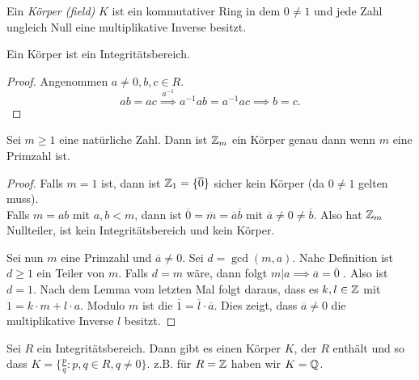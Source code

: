 \begin{definition}
	Ein \emph{Körper (field)} $K$ ist ein kommutativer Ring in dem $0 \neq 1$ und jede Zahl ungleich Null eine multiplikative Inverse besitzt.
\end{definition}

\begin{lemma}
	Ein Körper ist ein Integritätsbereich.
\end{lemma}

\begin{proof}
	Angenommen $a \neq  0, b,c \in R$.
	\[
	ab = ac \stackrel{a^{-1}}{\implies} a^{-1} a b = a^{-1} a c \implies b = c
	.\] 
\end{proof}

\begin{proposition}
	Sei $m \geq 1$ eine natürliche Zahl.
	Dann ist $\mathbb{Z}_{m}$ ein Körper genau dann wenn $m$ eine Primzahl ist.
\end{proposition}

\begin{proof}
	Falls $m=1$ ist, dann ist $\mathbb{Z}_{1} = \{\overline{0}\}$ sicher kein Körper (da $0 \neq 1$ gelten muss).\\
	Falls $m = ab$ mit $a,b < m$, dann ist $\overline{0} = \overline{m} = \overline{a} \overline{b}$ mit $\overline{a} \neq 0 \neq \overline{b}$.
	Also hat $\mathbb{Z}_{m}$ Nullteiler, ist kein Integritätsbereich und kein Körper.

	Sei nun $m$ eine Primzahl und $\overline{a} \neq 0$. Sei $d = \gcd(m,a)$.
	Nahc Definition ist $d \geq 1$ ein Teiler von $m$.
	Falls $d = m$ wäre, dann folgt $m \vert a \implies \overline{a} = \overline{0}$ \contra.
	Also ist $d = 1$. Nach dem Lemma vom letzten Mal folgt daraus, 
	dass es $k,l \in \mathbb{Z}$ mit $1 = k \cdot m + l \cdot a$. Modulo $m$ ist die $\overline{1} = \overline{l} \cdot \overline{a}$.
	Dies zeigt, dass $\overline{a} \neq 0$ die multiplikative Inverse $l$ besitzt.
\end{proof}

\begin{theorem}[Quotientenkörper (S.38)]
	Sei $R$ ein Integritätsbereich. Dann gibt es einen Körper $K$, der $R$ enthält und so dass $K = \{\frac{p}{q}: p,q \in R , q \neq 0\}$.
	z.B. für $R = \mathbb{Z}$ haben wir $K = \mathbb{Q}$.
\end{theorem}

